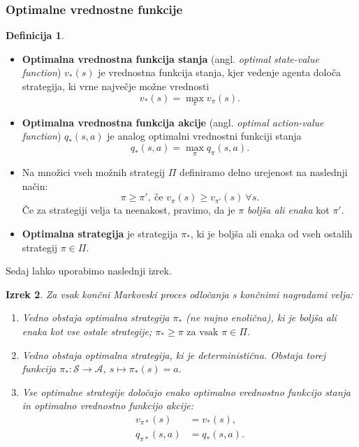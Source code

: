 \documentclass[12pt,a4paper]{amsart}
\theoremstyle{definition} %
\newtheorem{definicija}{Definicija}[section]
\theoremstyle{plain} %
\newtheorem{izrek}[definicija]{Izrek}
\begin{document}
\subsubsection{Optimalne vrednostne funkcije}
\begin{definicija}
    ~
    \begin{itemize}
        \item \textbf{Optimalna vrednostna funkcija stanja} (angl. \textit{optimal state-value 
                function}) $v_*(s)$ je vrednostna funkcija stanja, kjer vedenje agenta določa 
                strategija, ki vrne največje možne vrednosti
                $$
                v_*(s) = \max_\pi v_\pi(s).
                $$
        \item \textbf{Optimalna vrednostna funkcija akcije} (angl. \textit{optimal action-value 
                function}) $q_*(s, a)$ je analog optimalni vrednostni funkciji stanja
                $$
                q_*(s, a) = \max_\pi q_\pi(s, a).
                $$
        \item Na množici vseh možnih strategij $\Pi$ definiramo delno urejenost na naslednji način:
                $$
                \pi \geq \pi', \medspace \text{če } v_\pi(s) \geq v_{\pi'}(s) ~ \forall s. 
                $$
                Če za strategiji velja ta neenakost, pravimo, da je $\pi$ \textit{boljša ali enaka} 
                kot $\pi'$.
        \item \textbf{Optimalna strategija} je strategija $\pi_*$, ki je boljša ali enaka od vseh 
                ostalih strategij $\pi \in \Pi$.
    \end{itemize}
\end{definicija}
Sedaj lahko uporabimo naslednji izrek.

\begin{izrek}\label{optim}
    Za vsak končni Markovski proces odločanja s končnimi nagradami velja: 
    \begin{enumerate}
        \item Vedno obstaja \textit{optimalna} strategija $\pi_*$ (ne nujno enolična), ki je boljša 
                ali enaka kot vse ostale strategije; $\pi_* \geq \pi \text{ za vsak }  \pi \in \Pi$. 
        
        \item Vedno obstaja optimalna strategija, ki je \textit{deterministična}. Obstaja torej funkcija  
                $\pi_*: \mathcal{S} \rightarrow \mathcal{A}$, $s \mapsto \pi_*(s) = a$.

        \item Vse optimalne strategije določajo enako optimalno vrednostno funkcijo stanja in 
                optimalno vrednostno funkcijo akcije:
                \begin{align*}
                    v_{\pi*}(s) &= v_*(s), \\
                    q_{\pi*}(s, a) &= q_*(s, a).
                \end{align*}
    \end{enumerate} 
\end{izrek}
\end{document}
